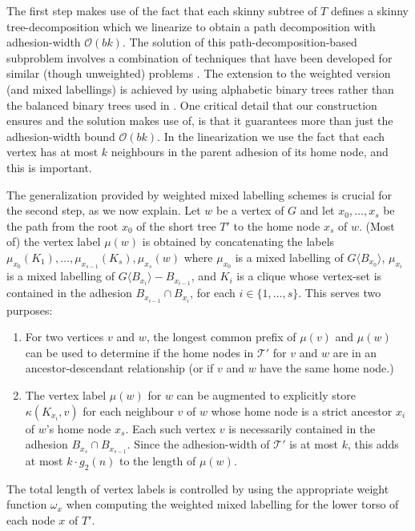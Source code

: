 \documentclass{patmorin}
\newcommand{\torso}[2]{{#1}\langle{#2}\rangle}
\newcommand{\Oh}{\calO}
\newcommand{\calO}{\mathcal{O}}
\newcommand{\calT}{\mathcal{T}}
\begin{document}
  The first step makes use of the fact that each skinny subtree of $T$ defines a skinny tree-decomposition which we linearize to obtain a path decomposition with adhesion-width $\Oh(bk)$. The solution of this path-decomposition-based subproblem involves a combination of techniques that have been developed for similar (though unweighted) problems \cite{gavoille.labourel:shorter,dujmovic.esperet.ea:adjacency}. The extension to the weighted version (and mixed labellings) is achieved by using alphabetic binary trees rather than the balanced binary trees used in \cite{gavoille.labourel:shorter,dujmovic.esperet.ea:adjacency}.  One critical detail  that our construction ensures and the solution makes use of, is that it guarantees more than just the adhesion-width bound \(\Oh(bk)\). In the linearization we use the fact that each vertex has at most $k$ neighbours in the parent adhesion of its home node, and this is important.

  The generalization provided by weighted mixed labelling schemes is crucial for the second step, as we now explain.
  Let $w$ be a vertex of $G$ and let $x_0,\ldots,x_s$ be the path from the root $x_0$ of the short tree $T'$ to the home node $x_s$ of $w$.  (Most of) the vertex label $\mu(w)$ is obtained by concatenating the labels $\mu_{x_0}(K_1),\ldots,\mu_{x_{s-1}}(K_s),\mu_{x_s}(w)$ where $\mu_{x_0}$ is a mixed labelling of $\torso{G}{B_{x_0}}$, $\mu_{x_i}$ is a mixed labelling of $\torso{G}{B_{x_i}}-B_{x_{i-1}}$, and $K_i$ is a clique whose vertex-set is contained in the adhesion $B_{x_{i-1}}\cap B_{x_i}$, for each $i\in\{1,\ldots,s\}$.  This serves two purposes:
  \begin{enumerate}
      \item For two vertices $v$ and $w$, the longest common prefix of $\mu(v)$ and $\mu(w)$ can be used to determine if the home nodes in $\calT'$ for $v$ and $w$ are in an ancestor-descendant relationship (or if $v$ and $w$ have the same home node.)
      \item The vertex label $\mu(w)$ for $w$ can be augmented to explicitly store $\kappa(K_{x_i},v)$ for each neighbour $v$ of $w$ whose home node is a strict ancestor $x_{i}$ of $w$'s home node $x_{s}$. Each such vertex $v$ is necessarily contained in the adhesion $B_{x_s}\cap B_{x_{s-1}}$.  Since the adhesion-width of $\calT'$ is at most $k$, this adds at most $k\cdot g_2(n)$ to the length of $\mu(w)$.
  \end{enumerate}
  The total length of vertex labels is controlled by using the appropriate weight function $\omega_{x}$ when computing the weighted mixed labelling for the lower torso of each node $x$ of $T'$.
\end{document}
